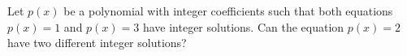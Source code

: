 Let $p(x)$ be a polynomial with integer coefficients such that both equations $p(x)=1$ and $p(x)=3$ have integer solutions. Can the equation $p(x)=2$ have two different integer solutions?